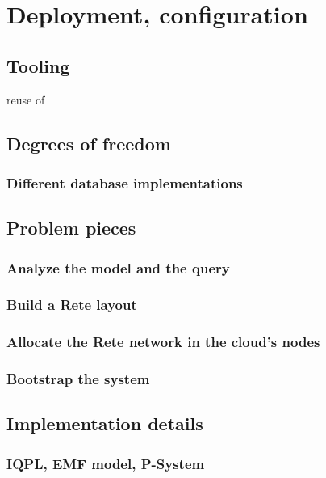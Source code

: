 \section{Deployment, configuration}


\subsection{Tooling}

reuse of \eiq



\subsection{Degrees of freedom}

\subsubsection{Different database implementations}


\subsection{Problem pieces}

\subsubsection{Analyze the model and the query}

\subsubsection{Build a Rete layout}

\subsubsection{Allocate the Rete network in the cloud's nodes}

\subsubsection{Bootstrap the system}

\subsection{Implementation details}

\subsubsection{IQPL, EMF model, P-System}

